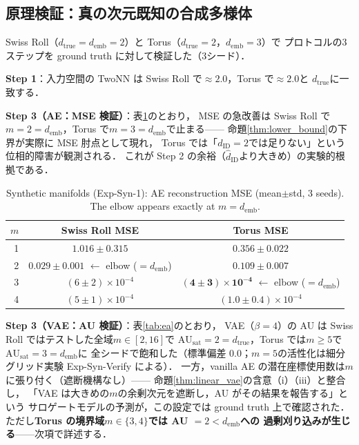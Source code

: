 \documentclass[11pt,a4paper]{jsarticle}
\newcommand{\dID}{d_{\mathrm{ID}}}
\newcommand{\hatdID}{\hat{d}_{\mathrm{ID}}}
\newcommand{\dtrue}{d_{\mathrm{true}}}
\newcommand{\AUsat}{\mathrm{AU}_{\mathrm{sat}}}
\newcommand{\demb}{d_{\mathrm{emb}}}
\begin{document}
\subsection{原理検証：真の次元既知の合成多様体}\label{sec:exp_syn}

Swiss Roll（$\dtrue = \demb = 2$）と Torus（$\dtrue = 2$，$\demb = 3$）で
プロトコルの3ステップを ground truth に対して検証した（3シード）．

\textbf{Step 1}：入力空間の TwoNN は Swiss Roll で$\approx 2.0$，Torus で$\approx 2.0$と
$\dtrue$に一致する．

\textbf{Step 3（AE：MSE 検証）}：表\ref{tab:e1}のとおり，
MSE の急改善は Swiss Roll で$m = 2 = \demb$，Torus で$m = 3 = \demb$で止まる——
命題\ref{thm:lower_bound}の下界が実際に MSE 肘点として現れ，
Torus では「$\dID = 2$では足りない」という位相的障害が観測される．
これが Step 2 の余裕（$\hatdID$より大きめ）の実験的根拠である．

\begin{table}[H]
\centering
\caption{Synthetic manifolds (Exp-Syn-1): AE reconstruction MSE
(mean$\pm$std, 3 seeds). The elbow appears exactly at $m = \demb$.}
\label{tab:e1}
\small
\begin{tabular}{rcc}
\toprule
$m$ & Swiss Roll MSE & Torus MSE \\
\midrule
1 & $1.016 \pm 0.315$ & $0.356 \pm 0.022$ \\
2 & $\boldsymbol{0.029 \pm 0.001}$ $\leftarrow$ elbow ($= \demb$) & $0.109 \pm 0.007$ \\
3 & $(6 \pm 2) \times 10^{-4}$ & $\boldsymbol{(4 \pm 3) \times 10^{-4}}$ $\leftarrow$ elbow ($= \demb$) \\
4 & $(5 \pm 1) \times 10^{-4}$ & $(1.0 \pm 0.4) \times 10^{-4}$ \\
\bottomrule
\end{tabular}
\end{table}

\textbf{Step 3（VAE：AU 検証）}：表\ref{tab:ea}のとおり，
VAE（$\beta = 4$）の AU は Swiss Roll ではテストした全域$m \in [2, 16]$で
$\AUsat = 2 = \dtrue$，Torus では$m \geq 5$で$\AUsat = 3 = \demb$に
全シードで飽和した（標準偏差 0.0；$m = 5$の活性化は細分グリッド実験
Exp-Syn-Verify による）．
一方，vanilla AE の潜在座標使用数は$m$に張り付く（遮断機構なし）——
命題\ref{thm:linear_vae}の含意（i）（iii）と整合し，
「VAE は大きめの$m$の余剰次元を遮断し，AU がその結果を報告する」という
サロゲートモデルの予測が，この設定では ground truth 上で確認された．
ただし\textbf{Torus の境界域$m \in \{3, 4\}$では AU $= 2 < \demb$への
過剰刈り込みが生じる}——次項で詳述する．
\end{document}
